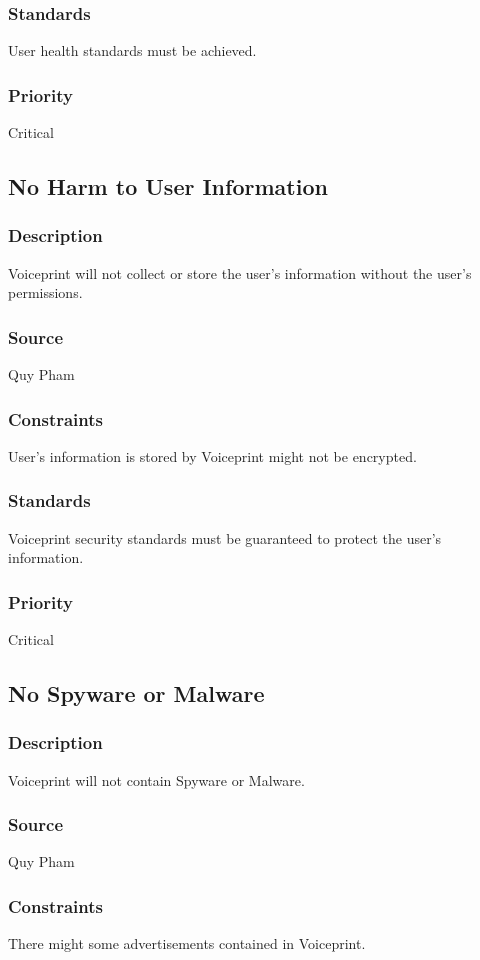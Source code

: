\subsubsection{Standards}
User health standards must be achieved.
\subsubsection{Priority}
Critical

\subsection{No Harm to User Information}
\subsubsection{Description}
Voiceprint will not collect or store the user's information without the user's permissions.
\subsubsection{Source}
Quy Pham
\subsubsection{Constraints}
User's information is stored by Voiceprint might not be encrypted.
\subsubsection{Standards}
Voiceprint security standards must be guaranteed to protect the user's information.
\subsubsection{Priority}
Critical

\subsection{No Spyware or Malware}
\subsubsection{Description}
Voiceprint will not contain Spyware or Malware.
\subsubsection{Source}
Quy Pham
\subsubsection{Constraints}
There might some advertisements contained in Voiceprint.
